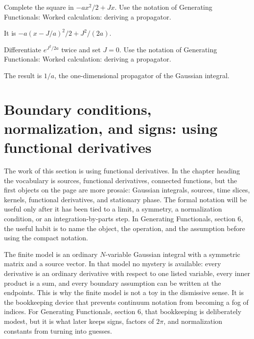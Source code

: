 \begin{exercise}
Complete the square in \(-ax^2/2+Jx\).  Use the notation of Generating Functionals: Worked calculation: deriving a propagator.
\begin{answer}
It is \(-a(x-J/a)^2/2+J^2/(2a)\).
\end{answer}
\end{exercise}

\begin{exercise}
Differentiate \(e^{J^2/2a}\) twice and set \(J=0\).  Use the notation of Generating Functionals: Worked calculation: deriving a propagator.
\begin{answer}
The result is \(1/a\), the one-dimensional propagator of the Gaussian integral.
\end{answer}
\end{exercise}



\section{Boundary conditions, normalization, and signs: using functional derivatives}













The work of this section is using functional derivatives.  In the chapter heading the vocabulary is sources, functional derivatives, connected functions, but the first objects on the page are more prosaic: Gaussian integrals, sources, time slices, kernels, functional derivatives, and stationary phase.  The formal notation will be useful only after it has been tied to a limit, a symmetry, a normalization condition, or an integration-by-parts step.  In Generating Functionals, section 6, the useful habit is to name the object, the operation, and the assumption before using the compact notation.

The finite model is an ordinary \(N\)-variable Gaussian integral with a symmetric matrix and a source vector.  In that model no mystery is available: every derivative is an ordinary derivative with respect to one listed variable, every inner product is a sum, and every boundary assumption can be written at the endpoints.  This is why the finite model is not a toy in the dismissive sense.  It is the bookkeeping device that prevents continuum notation from becoming a fog of indices.  For Generating Functionals, section 6, that bookkeeping is deliberately modest, but it is what later keeps signs, factors of \(2\pi\), and normalization constants from turning into guesses.

